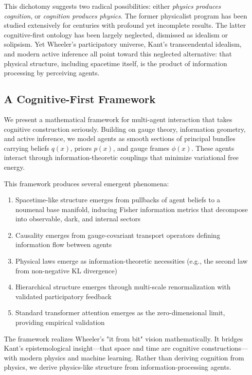 \documentclass[11pt]{article}
\begin{document}
This dichotomy suggests two radical possibilities: either \emph{physics produces cognition}, or \emph{cognition produces physics}. The former physicalist program has been studied extensively for centuries with profound yet incomplete results. The latter cognitive-first ontology has been largely neglected, dismissed as idealism or solipsism. Yet Wheeler's participatory universe, Kant's transcendental idealism, and modern active inference all point toward this neglected alternative: that physical structure, including spacetime itself, is the product of information processing by perceiving agents.

\subsection{A Cognitive-First Framework}

We present a mathematical framework for multi-agent interaction that takes cognitive construction seriously. Building on gauge theory, information geometry, and active inference, we model agents as smooth sections of principal bundles carrying beliefs $q(x)$, priors $p(x)$, and gauge frames $\phi(x)$. These agents interact through information-theoretic couplings that minimize variational free energy.

This framework produces several emergent phenomena:
\begin{enumerate}
\item Spacetime-like structure emerges from pullbacks of agent beliefs to a noumenal base manifold, inducing Fisher information metrics that decompose into observable, dark, and internal sectors

\item Causality emerges from gauge-covariant transport operators defining information flow between agents
\item Physical laws emerge as information-theoretic necessities (e.g., the second law from non-negative KL divergence)
\item Hierarchical structure emerges through multi-scale renormalization with validated participatory feedback
\item Standard transformer attention emerges as the zero-dimensional limit, providing empirical validation
\end{enumerate}

The framework realizes Wheeler's "it from bit" vision mathematically. It bridges Kant's epistemological insight---that space and time are cognitive constructions---with modern physics and machine learning. Rather than deriving cognition from physics, we derive physics-like structure from information-processing agents.
\end{document}
